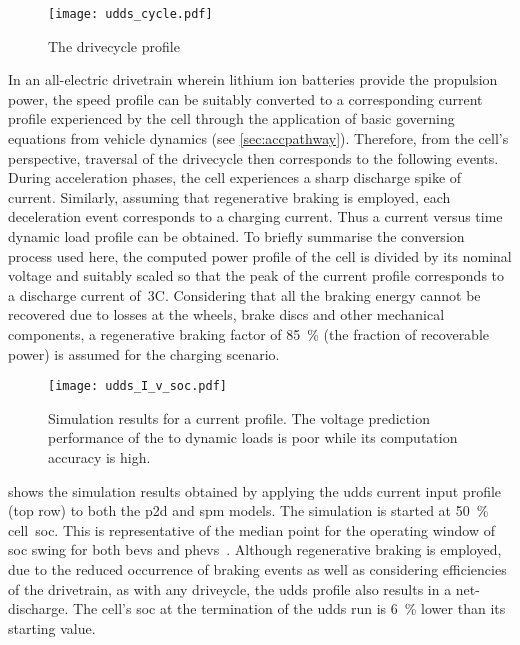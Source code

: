 \begin{figure}[!htbp]
    \centering
    \texttt{[image: udds\_cycle.pdf]}
    \caption{The  drivecycle profile}
    \label{fig:uddsspeedvstimecycle}
\end{figure}

In  an  all-electric  drivetrain  wherein  lithium  ion  batteries  provide  the
propulsion power, the speed profile can be suitably converted to a corresponding
current  profile  experienced by  the  cell  through  the application  of  basic
governing   equations  from   vehicle   dynamics  (see   \cref{sec:accpathway}).
Therefore,  from  the  cell's  perspective, traversal  of  the  drivecycle  then
corresponds  to  the following  events.  During  acceleration phases,  the  cell
experiences  a  sharp  discharge  spike of  current.  Similarly,  assuming  that
regenerative  braking is  employed,  each deceleration  event  corresponds to  a
charging  current. Thus  a  current  versus time  dynamic  load  profile can  be
obtained. To  briefly summarise the  conversion process used here,  the computed
power profile of the cell is divided  by its nominal voltage and suitably scaled
so that the peak  of the current profile corresponds  to a discharge current
of~3C. Considering that all the braking energy cannot be recovered due to losses
at  the wheels,  brake discs  and  other mechanical  components, a  regenerative
braking  factor of  \SI{85}{\percent}  (the fraction  of  recoverable power)  is
assumed for  the charging scenario.


\begin{figure}[!htbp]
    \centering
    \texttt{[image: udds\_I\_v\_soc.pdf]} %
    \caption[Simulation results of  and 
    models to  current profile]{Simulation results for a
         current profile. The voltage prediction performance
        of the  to dynamic loads is poor while its
     computation accuracy is high.}
    \label{fig:uddssimp2dspmresults}
\end{figure}

  shows   the  simulation  results   obtained  by
applying   the   \gls{udds}   current   input  profile   (top   row)   to   both
the   \gls{p2d}   and  \gls{spm}   models.   The   simulation  is   started   at
\SI{50}{\percent}  cell~\gls{soc}. This  is representative  of the  median point
for  the  operating   window  of  \gls{soc}  swing  for   both  \glspl{bev}  and
\glspl{phev}~\cite{Maksimovic2012}. Although  regenerative braking  is employed,
due  to  the  reduced  occurrence  of braking  events  as  well  as  considering
efficiencies of  the drivetrain, as  with any driveycle, the  \gls{udds} profile
also results in a net-discharge. The  cell's \gls{soc} at the termination of the
\gls{udds} run is \approx\SI{6}{\percent} lower than its starting value.

